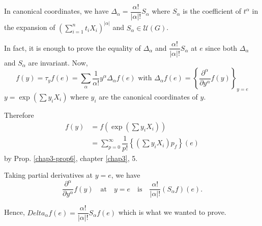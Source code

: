 \begin{thm}\label{chap3-thm3}%
{In canonical coordinates}, {we have}
$\Delta_\alpha=\dfrac{\alpha !}{|\alpha|!} S_\alpha$ {
  where} $S_\alpha$ { is the coefficient of} $t^\alpha$ { in
  the expansion of} $(\sum^{n}_{i=1} t_i X_i)^{|\alpha|}$ {
  and} $S_\alpha \in \mathcal{U}(G)$. 
 \end{thm}
 
 In fact, it is enough to prove the equality of
 $\Delta_\alpha$ and $\dfrac{\alpha!}{|\alpha|!}S_\alpha$
 at $e$ since both $\Delta_\alpha$ and $S_\alpha$ are
 invariant. Now,  
 $$
 f(y)=\tau_y f(e)= \sum\limits_{\alpha} \dfrac{1}{\alpha!} y^\alpha
 \Delta_\alpha f(e) \text{ with } \Delta_\alpha f(e)
 = \left\{\dfrac{\partial^\alpha}{\partial y^\alpha}
 f(y)\right\}_{y=e} 
 $$
$y = \exp (\sum y_i X_i)$ where $y_i$ are the canonical coordinates of $y$. 

Therefore\pageoriginale
\begin{align*}
f(y) &=f(\exp (\sum y_i X_i))\\
&=\sum^{\infty}_{p=0} \dfrac{1}{p !} \left\{(\sum y_i X_i)p_{f}\right\}(e)
 \end{align*}
by Prop. \ref{chap3-prop6}, chapter \ref{chap3}, 5.
 
Taking partial derivatives at $y=e$, we have 
  $$
  \dfrac{\partial^\alpha}{\partial y^\alpha} f(y)\quad \text{at}\quad y=e
  \quad\text{is}\quad \dfrac{\alpha !}{|\alpha| !} (S_\alpha f)(e). 
  $$

  Hence, $Delta_\alpha f(e) = \dfrac{\alpha !}{|\alpha|!}
  S_\alpha f(e)$ which is what we wanted to prove.  

